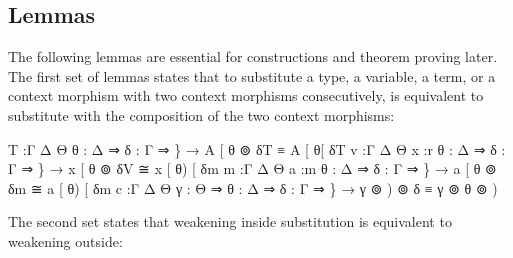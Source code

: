 \documentclass{acm_proc_article-sp}
\begin{document}
\subsection{Lemmas}

The following lemmas are essential for constructions and theorem
proving later.  The first set of lemmas states that to substitute a
type, a variable, a term, or a context morphism with two context
morphisms consecutively, is equivalent to substitute with the
composition of the two context morphisms:

\begin{code}%
\>\AgdaFunction{
[⊚]}T    :\AgdaBound{\{}Γ Δ Θ \AgdaBound{\{}θ : Δ ⇒ \AgdaBound{\{}δ : Γ ⇒ \} 
        → A [ θ ⊚ δ\AgdaFunction{ ]}T ≡ \AgdaBound{(}A [ θ\AgdaFunction{ ]}\AgdaFunction{)}[ δ\AgdaFunction{ ]}T  
\AgdaFunction{
[⊚]}v    :\AgdaBound{\{}Γ Δ Θ \AgdaBound{(}x :r \AgdaBound{\{}θ : Δ ⇒ \AgdaBound{\{}δ : Γ ⇒ \}
        → x [ θ ⊚ δ\AgdaFunction{ ]}V ≅ \AgdaBound{(}x [ θ\AgdaFunction{ ]}) [ δ\AgdaFunction{ ]t}m
m   :\AgdaBound{\{}Γ Δ Θ \AgdaBound{(}a :m \AgdaBound{\{}θ : Δ ⇒ \AgdaBound{\{}δ : Γ ⇒ \}
        → a [ θ ⊚ δ\AgdaFunction{ ]t}m ≅ \AgdaBound{(}a [ θ\AgdaFunction{ ]t}) [ δ\AgdaFunction{ ]t}m
c  :\AgdaBound{\{}Γ Δ Θ \AgdaBound{(}γ : Θ ⇒ \AgdaBound{\{}θ : Δ ⇒ \AgdaBound{\{}δ : Γ ⇒ \}  
        → \AgdaBound{(}γ ⊚ ) ⊚ δ ≡ γ ⊚ \AgdaBound{(}θ ⊚ )  
\<%
\end{code}




The second set states that weakening inside substitution is equivalent to weakening outside:
\end{document}
